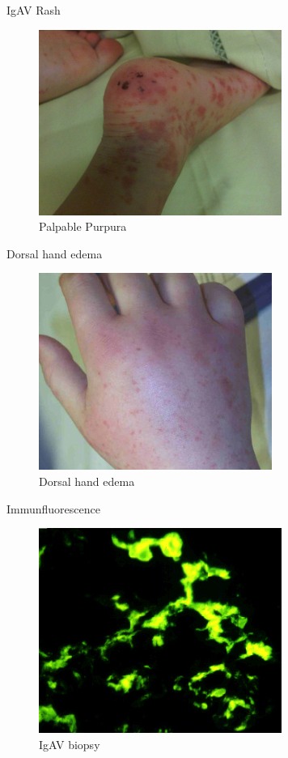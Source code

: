 \begin{frame}{IgAV Rash}

\begin{figure}[htbp]
\centering
\includegraphics{./img/SknlsnHnchSchnlnprpIgA.jpg}
\caption{Palpable Purpura}
\end{figure}

\end{frame}

\begin{frame}{Dorsal hand edema}

\begin{figure}[htbp]
\centering
\includegraphics{./img/IgAV_HSP_dorsal_edema_scale_crop.jpg}
\caption{Dorsal hand edema}
\end{figure}

\end{frame}

\begin{frame}{Immunfluorescence}

\begin{figure}[htbp]
\centering
\includegraphics{./img/IgA_nephropathy_IF.jpg}
\caption{IgAV biopsy}
\end{figure}

\end{frame}

